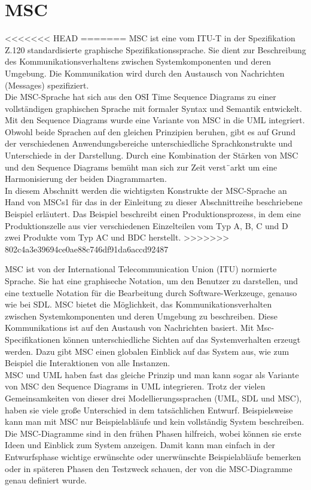 
\section{MSC}
\label{sc:MSC}
<<<<<<< HEAD
=======
\acs{MSC} ist eine vom \ac{ITU-T} in der Spezifikation Z.120
standardisierte graphische Spezifikationssprache. Sie dient
zur Beschreibung des Kommunikationsverhaltens zwischen
Systemkomponenten und deren Umgebung. Die Kommunikation
wird durch den Austausch von Nachrichten (Messages)
spezifiziert.\cite{MT009} \\
Die \ac{MSC}-Sprache hat sich aus den \ac{OSI} Time Sequence
Diagrams zu einer vollständigen graphischen Sprache
mit formaler Syntax und Semantik entwickelt.
Mit den Sequence Diagrams wurde eine Variante von \ac{MSC}
in die \ac{UML} integriert. Obwohl beide Sprachen auf den
gleichen Prinzipien beruhen, gibt es auf Grund der verschiedenen
Anwendungsbereiche unterschiedliche Sprachkonstrukte
und Unterschiede in der Darstellung. Durch eine
Kombination der Stärken von \ac{MSC} und den Sequence
Diagrams bemüht man sich zur Zeit verst¨arkt um eine Harmonisierung der beiden Diagrammarten.\\
In diesem Abschnitt werden die wichtigsten Konstrukte der
MSC-Sprache an Hand von MSCs1 für das in der Einleitung zu dieser Abschnittreihe beschriebene Beispiel erläutert. Das Beispiel beschreibt einen Produktionsprozess, in dem eine Produktionszelle aus vier verschiedenen Einzelteilen vom Typ A, B, C und D zwei Produkte vom Typ AC und BDC herstellt.
>>>>>>> 802c4a3e39694ce0ae88c746df91da6accd92487

MSC ist von der International Telecommunication Union (ITU) normierte Sprache.  Sie hat eine graphiseche Notation, um den Benutzer zu darstellen, und eine textuelle Notation für die Bearbeitung durch Software-Werkzeuge, genauso wie bei SDL.
MSC bietet die Möglichkeit, das Kommunikationsverhalten zwischen Systemkomponenten und deren Umgebung zu beschreiben. Diese Kommunikations ist auf den Austaush von Nachrichten basiert.
Mit Msc-Specifikationen können unterschiedliche Sichten auf das Systemverhalten erzeugt werden. 
Dazu gibt MSC einen globalen Einblick auf das System aus, wie zum Beispiel die Interaktionen von alle Instanzen.\\
MSC und UML haben fast das gleiche Prinzip und man kann sogar als Variante von MSC den Sequence Diagrams in UML integrieren.
Trotz der vielen Gemeinsamkeiten von dieser drei Modellierungssprachen (UML, SDL und MSC), haben sie viele große Unterschied in dem tatsächlichen Entwurf. Beispielsweise kann man mit MSC nur Beispielabläufe und kein vollständig System beschreiben.\\
Die MSC-Diagramme sind in den frühen Phasen hilfreich, wobei können sie erste Ideen und Einblick zum System anzeigen.
Damit kann man einfach in der Entwurfsphase wichtige erwünschte oder unerwünschte Beispielabläufe bemerken oder in späteren Phasen den Testzweck schauen, der von die MSC-Diagramme genau definiert wurde.\\

